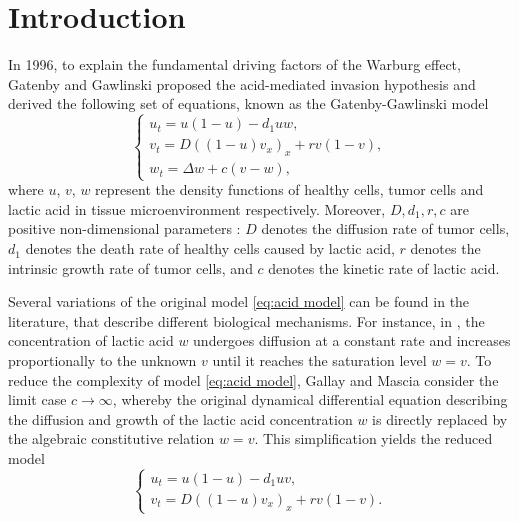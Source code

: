 \documentclass[preprint,sort&compress,final,12pt]{elsarticle}
\numberwithin{equation}{section}
\begin{document}
\newpage
\section{Introduction}
In 1996, to explain the fundamental driving factors of the Warburg effect, Gatenby and Gawlinski \cite{1996} proposed the acid-mediated invasion hypothesis and derived the following set of equations, known as the Gatenby-Gawlinski model
\begin{equation}\label{eq:acid model}
\begin{cases}
u_t=u(1-u)-d_1uw,\\[0.2cm]
v_t=D((1-u)v_x)_x+rv(1-v),\\[0.2cm]
w_t=\Delta w+c(v-w),
\end{cases}
\end{equation}
where $u$, $v$, $w$ represent the density functions of healthy cells, tumor cells and lactic acid in tissue microenvironment respectively. Moreover, $D, d_1, r, c$ are positive non-dimensional parameters  : $D$ denotes the diffusion rate of tumor cells, $d_1$ denotes the death rate of healthy cells caused by lactic acid, $r$ denotes the intrinsic growth rate of tumor cells, and $c$ denotes the kinetic rate of lactic acid.

Several variations of the original model \eqref{eq:acid model} can be found in the literature, that describe different biological mechanisms. For instance, in \cite{gm22}, the concentration of lactic acid $w$ undergoes diffusion at a constant rate and increases proportionally to the unknown $v$ until it reaches the saturation level $w = v$. To reduce the complexity of model \eqref{eq:acid model}, Gallay and Mascia \cite{gm22} consider the limit case $c\to\infty$, whereby the original dynamical differential equation describing the diffusion and growth of the lactic acid concentration $w$ is directly replaced by the algebraic constitutive relation $w=v$. This simplification yields the reduced model
\begin{equation}\label{eq:simple}
\begin{cases}
u_t=u(1-u)-d_1uv,\\[0.2cm]
v_t=D((1-u)v_x)_x+rv\left(1-v\right).
\end{cases}
\end{equation}
\end{document}
